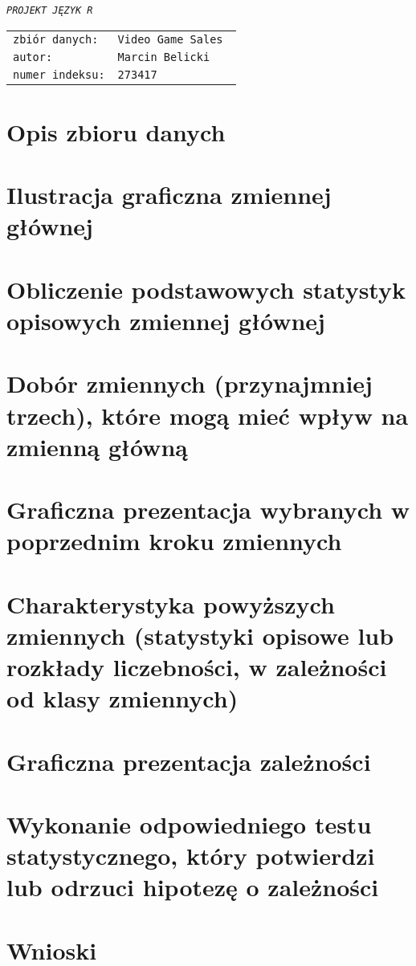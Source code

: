 \newcommand*{\includesDirectory}{includes}
\newcommand*{\settingsDirectory}{\includesDirectory/settings}








	\thispagestyle{empty}
	\vspace*{\fill}
			\begin{center}
				\Huge{
					\textit{\texttt{PROJEKT JĘZYK R}}
				}
			\end{center}
	\vspace*{\fill}
			\begin{tabular}{ll}
				\texttt{zbiór danych:}  & \texttt{Video Game Sales \cite{source}}\\
				\texttt{autor:}         & \texttt{Marcin Belicki}\\
				\texttt{numer indeksu:} & \texttt{273417}
			\end{tabular}
	\newpage
	\setlength{\parindent}{9mm}
	
	\section{Opis zbioru danych}
	
	\section{Ilustracja graficzna zmiennej głównej}
	
	\section{Obliczenie podstawowych statystyk opisowych zmiennej głównej}
	
	\section{Dobór zmiennych (przynajmniej trzech), które mogą mieć wpływ na zmienną główną}
	
	\section{Graficzna prezentacja wybranych w poprzednim kroku zmiennych}
	
	\section{Charakterystyka powyższych zmiennych (statystyki opisowe lub rozkłady liczebności, w zależności od klasy zmiennych)}
	
	\section{Graficzna prezentacja zależności}
	
	\section{Wykonanie odpowiedniego testu statystycznego, który potwierdzi lub odrzuci hipotezę o zależności}

	\section{Wnioski}


	
